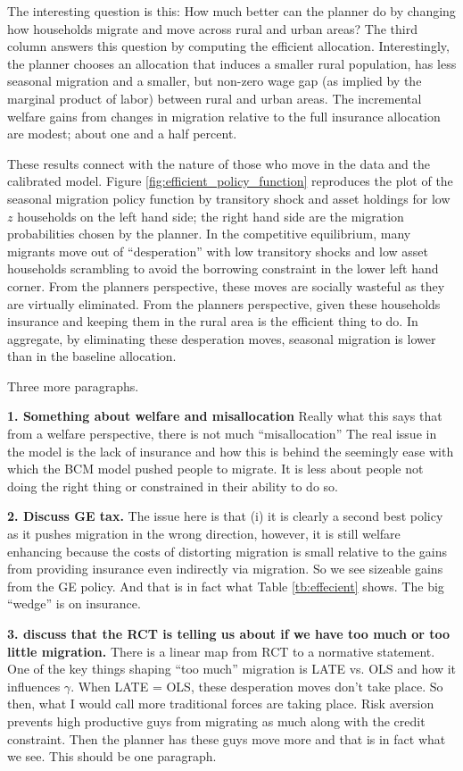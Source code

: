\documentclass[12pt,pdftex]{article}
\begin{document}
\begin{onehalfspacing}
The interesting question is this: How much better can the planner do by changing how households migrate and move across rural and urban areas? The third column answers this question by computing the efficient allocation. Interestingly, the planner chooses an allocation that induces a smaller rural population, has less seasonal migration and a smaller, but non-zero wage gap (as implied by the marginal product of labor) between rural and urban areas. The incremental welfare gains from changes in migration relative to the full insurance allocation are modest; about one and a half percent.

These results connect with the nature of those who move in the data and the calibrated model. Figure \ref{fig:efficient_policy_function} reproduces the plot of the seasonal migration policy function by transitory shock and asset holdings for low $z$ households on the left hand side; the right hand side are the migration probabilities chosen by the planner. In the competitive equilibrium, many migrants move out of ``desperation'' with low transitory shocks and low asset households scrambling to avoid the borrowing constraint in the lower left hand corner. From the planners perspective, these moves are socially wasteful as they are virtually eliminated. From the planners perspective, given these households insurance and keeping them in the rural area is the efficient thing to do. In aggregate, by eliminating these desperation moves, seasonal migration is lower than in the baseline allocation.

Three more paragraphs.

\textbf{1. Something about welfare and misallocation} Really what this says that from a welfare perspective, there is not much ``misallocation'' The real issue in the model is the lack of insurance and how this is behind the seemingly ease with which the BCM model pushed people to migrate. It is less about people not doing the right thing or constrained in their ability to do so.

\textbf{2. Discuss GE tax.} The issue here is that (i) it is clearly a second best policy as it pushes migration in the wrong direction, however, it is still welfare enhancing because the costs of distorting migration is small relative to the gains from providing insurance even indirectly via migration. So we see sizeable gains from the GE policy. And that is in fact what Table \ref{tb:effecient} shows. The big ``wedge'' is on insurance.

\textbf{3. discuss that the RCT is telling us about if we have too much or too little migration.} There is a linear map from RCT to a normative statement. One of the key things shaping ``too much'' migration is LATE vs. OLS and how it influences $\gamma$. When LATE = OLS, these desperation moves don't take place. So then, what I would call more traditional forces are taking place. Risk aversion prevents high productive guys from migrating as much along with the credit constraint. Then the planner has these guys move more and that is in fact what we see. This should be one paragraph.




\end{onehalfspacing}
\end{document}
